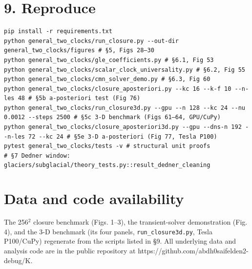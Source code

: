 \documentclass[aps,prfluids,preprint,superscriptaddress,nofootinbib]{revtex4-2}
\newcommand{\code}[1]{\texttt{#1}}
\begin{document}
\section*{9. Reproduce}

\begin{Verbatim}
pip install -r requirements.txt
python general_two_clocks/run_closure.py --out-dir general_two_clocks/figures # §5, Figs 28–30
python general_two_clocks/gle_coefficients.py # §6.1, Fig 53
python general_two_clocks/scalar_clock_universality.py # §6.2, Fig 55
python general_two_clocks/cmn_solver_demo.py # §6.3, Fig 60
python general_two_clocks/closure_aposteriori.py --kc 16 --k-f 10 --n-les 48 # §5b a-posteriori test (Fig 76)
python general_two_clocks/run_closure3d.py --gpu --n 128 --kc 24 --nu 0.0012 --steps 2500 # §5c 3-D benchmark (Figs 61–64, GPU/CuPy)
python general_two_clocks/closure_aposteriori3d.py --gpu --dns-n 192 --n-les 72 --kc 24 # §5e 3-D a-posteriori (Fig 77, Tesla P100)
pytest general_two_clocks/tests -v # structural unit proofs
# §7 Dedner window: glaciers/subglacial/theory_tests.py::result_dedner_cleaning
\end{Verbatim}

\section*{Data and code availability}
The 256\ensuremath{^{2}} closure benchmark (Figs. 1–3), the transient-solver demonstration (Fig. 4), and the 3-D benchmark (its four panels, \code{run\_\allowbreak{}closure3d.\allowbreak{}py}, Tesla P100/CuPy) regenerate from the scripts listed in §9. All underlying data and analysis code are in the public repository at https://github.com/abdh0saifelden2-debug/K.
\end{document}
